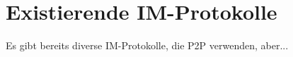 \section{Existierende IM-Protokolle}
Es gibt bereits diverse IM-Protokolle, die P2P verwenden, aber...